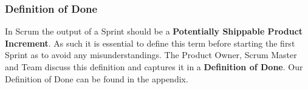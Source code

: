 \subsubsection{Definition of Done}

In Scrum the output of a Sprint should be a \textbf{Potentially Shippable Product Increment}. As such it is essential to define this term before starting the first Sprint as to avoid any misunderstandings. The Product Owner, Scrum Master and Team discuss this definition and captures it in a \textbf{Definition of Done}.
Our Definition of Done can be found in the appendix.